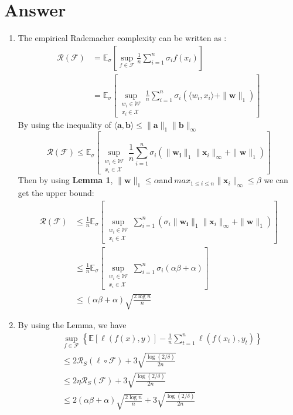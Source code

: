 \documentclass[
	12pt, %
]{fphw}
\begin{document}
\section*{Answer}
\begin{enumerate}
	\item The empirical Rademacher complexity can be written as :
	\begin{equation*}
		\begin{aligned}
			\mathcal{R}(\mathcal{F}) & ={\mathbb{E}_{\sigma}}\left[\sup_{f\in\mathcal{F}}\frac1n\sum_{i=1}^n\sigma_i f(x_i)\right] \\
									 & ={\mathbb{E}_{\sigma}}\left[\sup_{\substack{w_i\in\mathcal{W}\\x_i\in\mathcal{X}}}\frac1n\sum_{i=1}^n\sigma_i (\langle w_i, x_i \rangle + \|\mathbf{w}\|_1) \right]
		\end{aligned}	
	\end{equation*}
	By using the inequality of $\langle\mathbf{a},\mathbf{b}\rangle\leq\|\mathbf{a}\|_1\|\mathbf{b}\|_\infty$
	\begin{equation*}
		\mathcal{R}(\mathcal{F})  \leq {\mathbb{E}_{\sigma}}\left[\sup_{\substack{w_i\in\mathcal{W}\\x_i\in\mathcal{X}}}\frac1n\sum_{i=1}^n\sigma_i( \|\mathbf{w_i}\|_1 \|\mathbf{x} _i\|_\infty+ \|\mathbf{w}\|_1)\right]								 
	\end{equation*}
	Then by using \textbf{Lemma 1},  $\|\mathbf{w}\|_1\leq\alpha $and$ \ max_{1\leq i\leq n}\|\mathbf{x} _i\|_\infty\leq \beta $  we can get the upper bound:
	\begin{equation*}
		\begin{aligned}
		\mathcal{R}(\mathcal{F}) & \leq \frac1n{\mathbb{E}_{\sigma}}\left[\sup_{\substack{w_i\in\mathcal{W}\\x_i\in\mathcal{X}}}\sum_{i=1}^n(\sigma_i \|\mathbf{w_i}\|_1 \|\mathbf{x} _i\|_\infty+\|\mathbf{w}\|_1)\right]	\\	
								 &\leq \frac1n{\mathbb{E}_{\sigma}}\left[\sup_{\substack{w_i\in\mathcal{W}\\x_i\in\mathcal{X}}}\sum_{i=1}^n\sigma_i (\alpha \beta + \alpha) \right]	\\
								 & \leq (\alpha \beta +\alpha) \sqrt{\frac{2\log n}{n}}
	\end{aligned}
	\end{equation*}
	\item By using the Lemma, we have
	\begin{equation*}
		\begin{aligned}
			&\sup_{f\in\mathcal{F}}\left\{\mathbb{E}[\ell(f(x),y)]-\frac1n\sum_{t=1}^n\ell\left(f\left(x_t\right),y_t\right)\right\} \\
			&\leq2\mathcal{R}_S(\ell\circ\mathcal{F})+3\sqrt{\frac{\log(2/\delta)}{2n}}\\
			&\leq2\eta\mathcal{R}_S(\mathcal{F})+3\sqrt{\frac{\log(2/\delta)}{2n}} \\
			&\leq2(\alpha \beta +\alpha) \sqrt{\frac{2\log n}{n}}+3\sqrt{\frac{\log(2/\delta)}{2n}}
			\end{aligned}
	\end{equation*} 
\end{enumerate}





\end{document}
